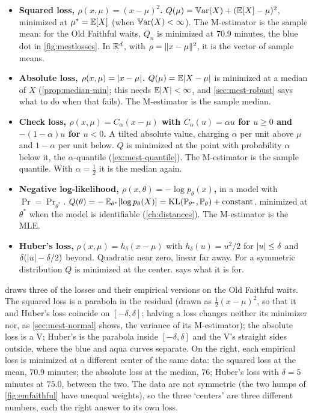\begin{worked}
\begin{itemize}
\item \textbf{Squared loss, $\rho(x, \mu) = (x - \mu)^2$.} $Q(\mu) = \operatorname*{\mathbb{V}\text{ar}}(X) + (\operatorname*{\mathbb{E}}[X] - \mu)^2$, minimized at $\mu^* = \operatorname*{\mathbb{E}}[X]$ (when $\operatorname*{\mathbb{V}\text{ar}}(X) < \infty$). The M-estimator is the sample mean: for the Old Faithful waits, $Q_n$ is minimized at $70.9$ minutes, the blue dot in \cref{fig:mestlosses}. In $\mathbb{R}^d$, with $\rho = \lVert x - \mu\rVert^2$, it is the vector of sample means.
\item \textbf{Absolute loss, $\rho(x, \mu) = \lvert x - \mu\rvert$.} $Q(\mu) = \operatorname*{\mathbb{E}}\lvert X - \mu\rvert$ is minimized at a median of $X$ (\cref{prop:median-min}; this needs $\operatorname*{\mathbb{E}}\lvert X\rvert < \infty$, and \cref{sec:mest-robust} says what to do when that fails). The M-estimator is the sample median.
\item \textbf{Check loss, $\rho(x, \mu) = C_\alpha(x - \mu)$ with $C_\alpha(u) = \alpha u$ for $u \geq 0$ and $-(1 - \alpha)u$ for $u < 0$.} A tilted absolute value, charging $\alpha$ per unit above $\mu$ and $1 - \alpha$ per unit below. $Q$ is minimized at the point with probability $\alpha$ below it, the $\alpha$-quantile (\cref{ex:mest-quantile}). The M-estimator is the sample quantile. With $\alpha = \frac12$ it is the median again.
\item \textbf{Negative log-likelihood, $\rho(x, \theta) = -\log p_\theta(x)$,} in a model with $\Pr = \Pr_{\theta^*}$. $Q(\theta) = -\operatorname*{\mathbb{E}}_{\theta^*}[\log p_\theta(X)] = \mathrm{KL}(\mathbb{P}_{\theta^*}, \mathbb{P}_\theta) + \text{constant}$, minimized at $\theta^*$ when the model is identifiable (\cref{ch:distances}). The M-estimator is the MLE.
\item \textbf{Huber's loss,} $\rho(x, \mu) = h_\delta(x - \mu)$ with $h_\delta(u) = u^2/2$ for $\lvert u\rvert \leq \delta$ and $\delta(\lvert u\rvert - \delta/2)$ beyond. Quadratic near zero, linear far away. For a symmetric distribution $Q$ is minimized at the center.  says what it is for.
\end{itemize}
\end{worked}

 draws three of the losses and their empirical versions on the Old Faithful waits.
The squared loss is a parabola in the residual (drawn as $\frac12(x - \mu)^2$, so that it and Huber's loss coincide on $[-\delta, \delta]$; halving a loss changes neither its minimizer nor, as \cref{sec:mest-normal} shows, the variance of its M-estimator); the absolute loss is a V; Huber's is the parabola inside $[-\delta, \delta]$ and the V's straight sides outside, where the blue and aqua curves separate.
On the right, each empirical loss is minimized at a different center of the same data: the squared loss at the mean, $70.9$ minutes; the absolute loss at the median, $76$; Huber's loss with $\delta = 5$ minutes at $75.0$, between the two.
The data are not symmetric (the two humps of \cref{fig:emfaithful} have unequal weights), so the three `centers' are three different numbers, each the right answer to its own loss.

